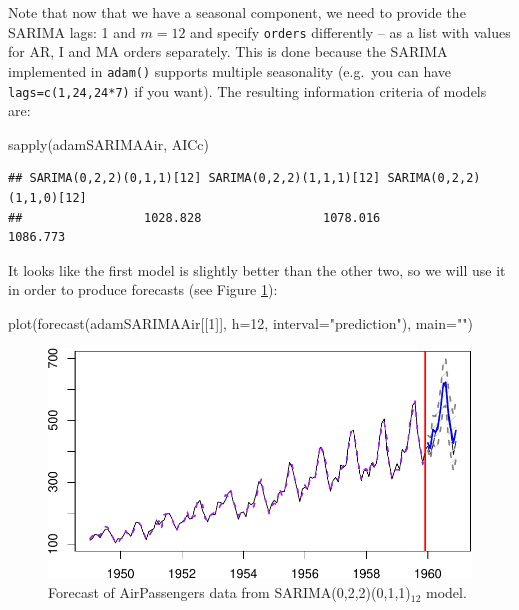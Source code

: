 \documentclass[
]{book}
\newenvironment{Shaded}{\begin{snugshade}}{\end{snugshade}}
\newcommand{\AttributeTok}[1]{\textcolor[rgb]{0.77,0.63,0.00}{#1}}
\newcommand{\DecValTok}[1]{\textcolor[rgb]{0.00,0.00,0.81}{#1}}
\newcommand{\FunctionTok}[1]{\textcolor[rgb]{0.00,0.00,0.00}{#1}}
\newcommand{\NormalTok}[1]{#1}
\newcommand{\StringTok}[1]{\textcolor[rgb]{0.31,0.60,0.02}{#1}}
\theoremstyle{definition}
\theoremstyle{definition}
\theoremstyle{definition}
\theoremstyle{definition}
\theoremstyle{remark}
\begin{document}
Note that now that we have a seasonal component, we need to provide the SARIMA lags: 1 and \(m=12\) and specify \texttt{orders} differently -- as a list with values for AR, I and MA orders separately. This is done because the SARIMA implemented in \texttt{adam()} supports multiple seasonality (e.g.~you can have \texttt{lags=c(1,24,24*7)} if you want). The resulting information criteria of models are:

\begin{Shaded}
\begin{Highlighting}[]
\FunctionTok{sapply}\NormalTok{(adamSARIMAAir, AICc)}
\end{Highlighting}
\end{Shaded}

\begin{verbatim}
## SARIMA(0,2,2)(0,1,1)[12] SARIMA(0,2,2)(1,1,1)[12] SARIMA(0,2,2)(1,1,0)[12] 
##                 1028.828                 1078.016                 1086.773
\end{verbatim}

It looks like the first model is slightly better than the other two, so we will use it in order to produce forecasts (see Figure \ref{fig:adamSARIMAPlotAir}):

\begin{Shaded}
\begin{Highlighting}[]
\FunctionTok{plot}\NormalTok{(}\FunctionTok{forecast}\NormalTok{(adamSARIMAAir[[}\DecValTok{1}\NormalTok{]], }\AttributeTok{h=}\DecValTok{12}\NormalTok{,}
              \AttributeTok{interval=}\StringTok{"prediction"}\NormalTok{),}
     \AttributeTok{main=}\StringTok{""}\NormalTok{)}
\end{Highlighting}
\end{Shaded}

\begin{figure}
\centering
\includegraphics{Svetunkov--2022----ADAM_files/figure-latex/adamSARIMAPlotAir-1.pdf}
\caption{\label{fig:adamSARIMAPlotAir}Forecast of AirPassengers data from SARIMA(0,2,2)(0,1,1)\(_{12}\) model.}
\end{figure}
\end{document}
